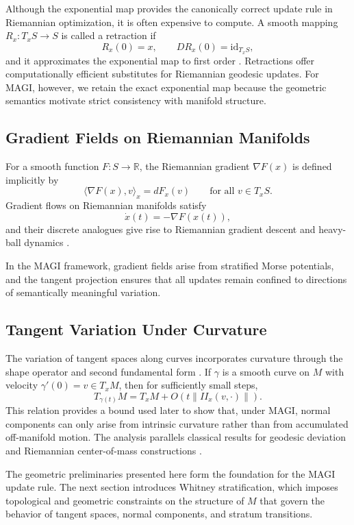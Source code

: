 \documentclass[12pt]{article}
\begin{document}
Although the exponential map provides the canonically correct update rule in Riemannian optimization, it is often expensive to compute. A smooth mapping $R_x : T_xS \to S$ is called a retraction if
\[
R_x(0)=x, \qquad DR_x(0) = \mathrm{id}_{T_xS},
\]
and it approximates the exponential map to first order \citep{Absil2008,Boumal2023}. Retractions offer computationally efficient substitutes for Riemannian geodesic updates. For MAGI, however, we retain the exact exponential map because the geometric semantics motivate strict consistency with manifold structure.

\subsection*{Gradient Fields on Riemannian Manifolds}

For a smooth function $F : S \to \mathbb{R}$, the Riemannian gradient $\nabla F(x)$ is defined implicitly by
\[
\langle \nabla F(x), v \rangle_x = dF_x(v)
\qquad
\text{for all } v \in T_xS.
\]
Gradient flows on Riemannian manifolds satisfy
\[
\dot{x}(t) = -\nabla F(x(t)),
\]
and their discrete analogues give rise to Riemannian gradient descent and heavy-ball dynamics \citep{Absil2008,Wibisono2016}.

In the MAGI framework, gradient fields arise from stratified Morse potentials, and the tangent projection ensures that all updates remain confined to directions of semantically meaningful variation.

\subsection*{Tangent Variation Under Curvature}

The variation of tangent spaces along curves incorporates curvature through the shape operator and second fundamental form \citep{doCarmoRiemannian1992,Sakai1996}. If $\gamma$ is a smooth curve on $M$ with velocity $\gamma'(0)=v\in T_xM$, then for sufficiently small steps,
\[
T_{\gamma(t)}M = T_xM + O(t\|II_x(v,\cdot)\|).
\]
This relation provides a bound used later to show that, under MAGI, normal components can only arise from intrinsic curvature rather than from accumulated off-manifold motion. The analysis parallels classical results for geodesic deviation \citep{Sakai1996} and Riemannian center-of-mass constructions \citep{Karcher1977}.

The geometric preliminaries presented here form the foundation for the MAGI update rule. The next section introduces Whitney stratification, which imposes topological and geometric constraints on the structure of $M$ that govern the behavior of tangent spaces, normal components, and stratum transitions.
\end{document}
